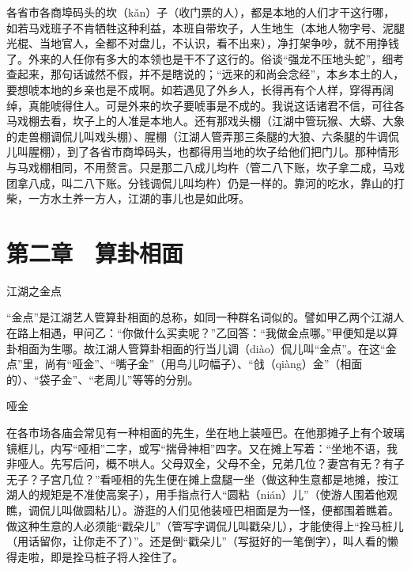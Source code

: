 \documentclass[12pt,UTF8]{ctexbook}
\begin{document}
各省市各商埠码头的坎（kǎn）子（收门票的人），都是本地的人们才干这行哪，如若马戏班子不肯牺牲这种利益，本班自带坎子，人生地生（本地人物字号、泥腿光棍、当地官人，全都不对盘儿，不认识，看不出来），净打架争吵，就不用挣钱了。外来的人任你有多大的本领也是干不了这行的。俗谈“强龙不压地头蛇”，细考查起来，那句话诚然不假，并不是瞎说的；“远来的和尚会念经”，本乡本土的人，要想唬本地的乡亲也是不成啊。如若遇见了外乡人，长得再有个人样，穿得再阔绰，真能唬得住人。可是外来的坎子要唬事是不成的。我说这话诸君不信，可往各马戏棚去看，坎子上的人准是本地人。还有那戏头棚（江湖中管玩猴、大蟒、大象的走兽棚调侃儿叫戏头棚）、腥棚（江湖人管弄那三条腿的大狼、六条腿的牛调侃儿叫腥棚），到了各省市商埠码头，也都得用当地的坎子给他们把门儿。那种情形与马戏棚相同，不用赘言。只是那二八成儿均杵（管二八下账，坎子拿二成，马戏团拿八成，叫二八下账。分钱调侃儿叫均杵）仍是一样的。靠河的吃水，靠山的打柴，一方水土养一方人，江湖的事儿也是如此呀。





\chapter{第二章　算卦相面}


江湖之金点


“金点”是江湖艺人管算卦相面的总称，如同一种群名词似的。譬如甲乙两个江湖人在路上相遇，甲问乙：“你做什么买卖呢？”乙回答：“我做金点哪。”甲便知是以算卦相面为生哪。故江湖人管算卦相面的行当儿调（diào）侃儿叫“金点”。在这“金点”里，尚有“哑金”、“嘴子金”（用鸟儿叼幅子）、“戗（qiàng）金”（相面的）、“袋子金”、“老周儿”等等的分别。





哑金


在各市场各庙会常见有一种相面的先生，坐在地上装哑巴。在他那摊子上有个玻璃镜框儿，内写“哑相”二字，或写“揣骨神相”四字。又在摊上写着：“坐地不语，我非哑人。先写后问，概不哄人。父母双全，父母不全，兄弟几位？妻宫有无？有子无子？子宫几位？”看哑相的先生便在摊上盘腿一坐（做这种生意都是地摊，按江湖人的规矩是不准使高案子），用手指点行人“圆粘（nián）儿”（使游人围着他观瞧，调侃儿叫做圆粘儿）。游逛的人们见他装哑巴相面是为一怪，便都围着瞧着。做这种生意的人必须能“戳朵儿”（管写字调侃儿叫戳朵儿），才能使得上“拴马桩儿（用话留你，让你走不了）”。还是倒“戳朵儿”（写挺好的一笔倒字），叫人看的懒得走啦，即是拴马桩子将人拴住了。
\end{document}
